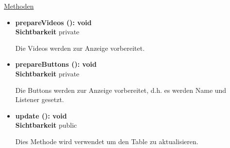 \underline{Methoden}
\begin{itemize}
\itemsep0pt

\item \textbf{prepareVideos (): void}\hfill\\
\textbf{Sichtbarkeit} private

Die Videos werden zur Anzeige vorbereitet.

\item \textbf{prepareButtons (): void}\hfill\\
\textbf{Sichtbarkeit} private

Die Buttons werden zur Anzeige vorbereitet, d.h. es werden Name und Listener gesetzt.

\item \textbf{update (): void}\hfill\\
\textbf{Sichtbarkeit} public

Dies Methode wird verwendet um den Table zu aktualisieren.

\end{itemize}
